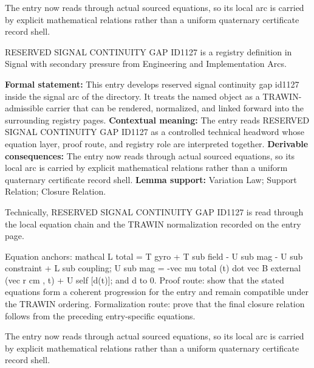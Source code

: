 The entry now reads through actual sourced equations, so its local arc is carried by explicit mathematical relations rather than a uniform quaternary certificate record shell.
\clearpage


\begingroup\small
{}
RESERVED SIGNAL CONTINUITY GAP ID1127 is a registry definition in Signal with secondary pressure from Engineering and Implementation Arcs.

\begingroup\footnotesize\setlength{\emergencystretch}{3em}\sloppy
\textbf{Formal statement:} This entry develops reserved signal continuity gap id1127 inside the signal arc of the directory. It treats the named object as a TRAWIN-admissible carrier that can be rendered, normalized, and linked forward into the surrounding registry pages. \textbf{Contextual meaning:} The entry reads RESERVED SIGNAL CONTINUITY GAP ID1127 as a controlled technical headword whose equation layer, proof route, and registry role are interpreted together. \textbf{Derivable consequences:} The entry now reads through actual sourced equations, so its local arc is carried by explicit mathematical relations rather than a uniform quaternary certificate record shell. \textbf{Lemma support:} Variation Law; Support Relation; Closure Relation.\par
\endgroup

Technically, RESERVED SIGNAL CONTINUITY GAP ID1127 is read through the local equation chain and the TRAWIN normalization recorded on the entry page.

Equation anchors: mathcal L total = T gyro + T sub field - U sub mag - U sub constraint + L sub coupling; U sub mag = -vec mu total (t) dot vec B external (vec r cm , t) + U self [d(t)]; and d to 0. Proof route: show that the stated equations form a coherent progression for the entry and remain compatible under the TRAWIN ordering. Formalization route: prove that the final closure relation follows from the preceding entry-specific equations.

The entry now reads through actual sourced equations, so its local arc is carried by explicit mathematical relations rather than a uniform quaternary certificate record shell.
\endgroup

